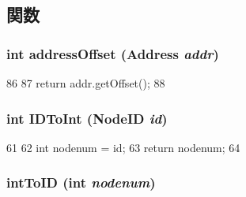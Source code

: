 \subsection{関数}
\hypertarget{RubySlicc__Util_8hh_a23322cb58f9528f114aa3bc1c85377bf}{
\subsubsection[{addressOffset}]{\setlength{\rightskip}{0pt plus 5cm}int addressOffset ({\bf Address} {\em addr})}}
\label{RubySlicc__Util_8hh_a23322cb58f9528f114aa3bc1c85377bf}



\begin{DoxyCode}
86 {
87     return addr.getOffset();
88 }
\end{DoxyCode}
\hypertarget{RubySlicc__Util_8hh_a4c6867d6bf98689723bdaa91c9c5e1ab}{
\subsubsection[{IDToInt}]{\setlength{\rightskip}{0pt plus 5cm}int IDToInt ({\bf NodeID} {\em id})}}
\label{RubySlicc__Util_8hh_a4c6867d6bf98689723bdaa91c9c5e1ab}



\begin{DoxyCode}
61 {
62     int nodenum = id;
63     return nodenum;
64 }
\end{DoxyCode}
\hypertarget{RubySlicc__Util_8hh_af871f54b5dfa4d06d5fa4bf151073079}{
\subsubsection[{intToID}]{ intToID (int {\em nodenum})}}
\label{RubySlicc__Util_8hh_af871f54b5dfa4d06d5fa4bf151073079}



